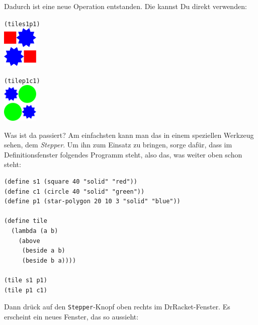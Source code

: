 Dadurch ist eine neue Operation entstanden.  Die kannst Du direkt
verwenden:
%
\begin{alltt}
(tile s1 p1)
\evalsto{} \includegraphics[width=48pt]{i1prog/tile1}

(tile p1 c1)
\evalsto{} \includegraphics[width=48pt]{i1prog/tile2}
\end{alltt}
%
Was ist da passiert?  Am einfachsten kann man das in einem speziellen
Werkzeug sehen, dem \textit{Stepper}.  Um ihn zum
Einsatz zu bringen, sorge dafür, dass im Definitionsfenster folgendes
Programm steht, also das, was weiter oben schon steht:
%
\begin{verbatim}
(define s1 (square 40 "solid" "red"))
(define c1 (circle 40 "solid" "green"))
(define p1 (star-polygon 20 10 3 "solid" "blue"))

(define tile
  (lambda (a b)
    (above
     (beside a b)
     (beside b a))))

(tile s1 p1)
(tile p1 c1)
\end{verbatim}
%
Dann drück auf den \texttt{Stepper}-Knopf oben rechts im
DrRacket-Fenster.  Es erscheint ein neues Fenster, das so aussieht:

